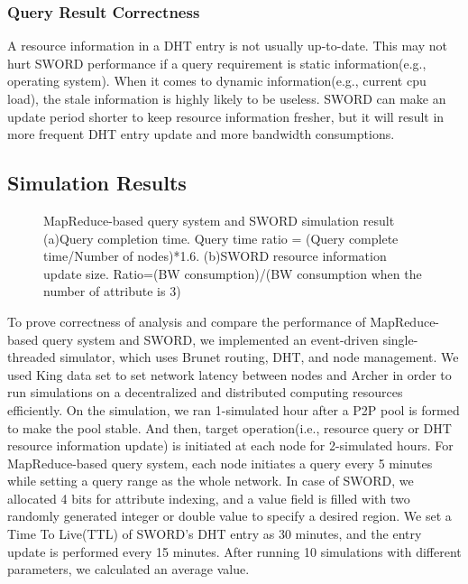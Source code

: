 \documentclass{acm_proc_article-sp}
\begin{document}
\subsubsection{Query Result Correctness}
A resource information in a DHT entry is not usually up-to-date. This may not hurt SWORD performance if a query requirement is static information(e.g., operating system). 
When it comes to dynamic information(e.g., current cpu load), the stale information is highly likely to be useless. 
SWORD can make an update period shorter to keep resource information fresher, but it will result in more frequent DHT entry update and more bandwidth consumptions.
\subsection{Simulation Results}
\begin{figure}[t]
\centering
{}
\caption{\label{fig:sim}MapReduce-based query system and SWORD simulation result (a)Query completion time. Query time ratio = (Query complete time/Number of nodes)*1.6. 
(b)SWORD resource information update size. Ratio=(BW consumption)/(BW consumption when the number of attribute is 3)}
\end{figure}
To prove correctness of analysis and compare the performance of MapReduce-based query system and SWORD, we implemented an event-driven single-threaded simulator, which uses Brunet\cite{brunet} routing, DHT, and node management.
We used King data set\cite{king} to set network latency between nodes and Archer\cite{archer} in order to run simulations on a decentralized and distributed computing resources efficiently. 
On the simulation, we ran 1-simulated hour after a P2P pool is formed to make the pool stable. And then, target operation(i.e., resource query or DHT resource information update) is initiated at each node for 2-simulated hours.
For MapReduce-based query system, each node initiates a query every 5 minutes while setting a query range as the whole network. 
In case of SWORD, we allocated 4 bits for attribute indexing, and a value field is filled with two randomly generated integer or double value to specify a desired region. 
We set a Time To Live(TTL) of SWORD's DHT entry as 30 minutes, and the entry update is performed every 15 minutes.
After running 10 simulations with different parameters, we calculated an average value.
\end{document}
